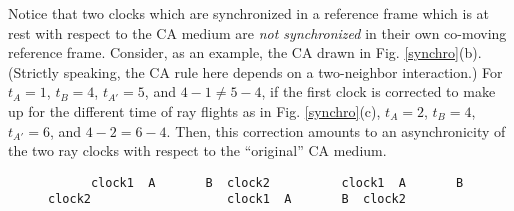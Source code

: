\documentclass[pre,preprint,showpacs,showkeys,amsfonts]{revtex4}
\begin{document}
Notice that two clocks which
are synchronized in a reference frame which is at rest with respect to
the CA medium are {\em not synchronized} in their own co-moving
reference frame.
Consider, as an example, the CA drawn in Fig.
\ref{synchro}(b). (Strictly speaking, the CA rule here depends on
a two-neighbor interaction.)
  For $t_A=1$, $t_B=4$, $t_{A'}=5$, and $4-1\neq 5-4$,
if the first clock is corrected to make up for the different time of ray
flights as in Fig. \ref{synchro}(c),
$t_A=2$, $t_B=4$, $t_{A'}=6$, and $4-2 = 6-4$.
Then, this correction amounts to an asynchronicity of the two
ray clocks with respect to the ``original'' CA medium.
\begin{figure}
{\tiny
 \begin{verbatim}
      clock1  A       B  clock2          clock1  A       B  clock2                   clock1  A       B  clock2


\end{verbatim}}
\end{figure}
\end{document}
